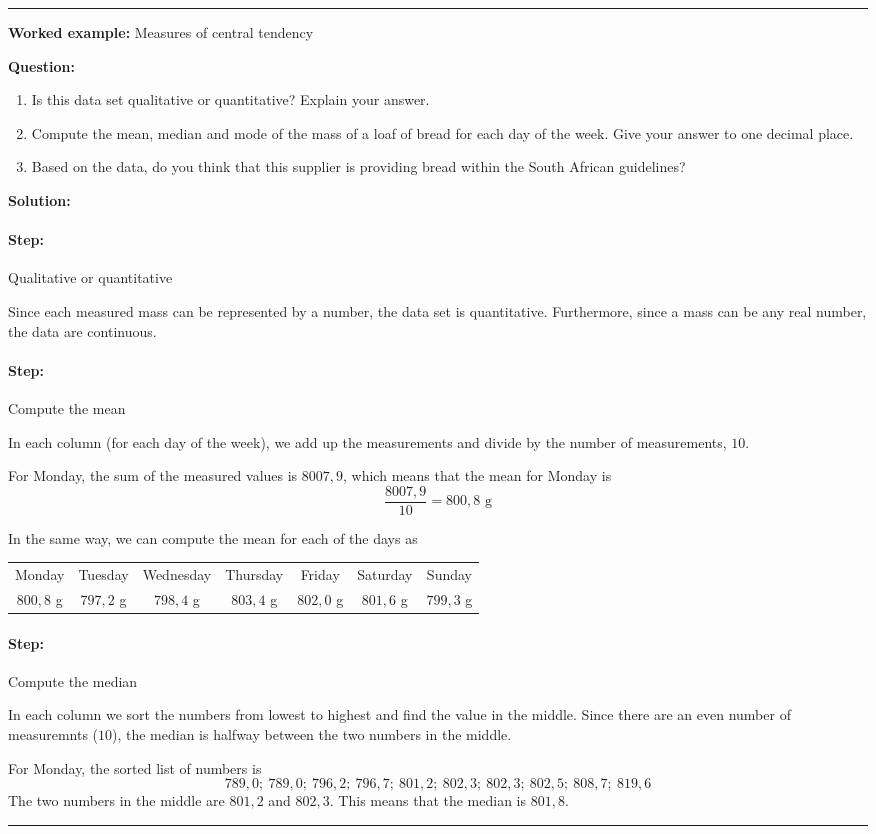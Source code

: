 \documentclass[a4paper,11pt]{report}
\newenvironment{wex}[3]%
{\rule{\linewidth}{0.5mm}
\textbf{Worked example:} #1

\textbf{Question:} #2

\textbf{Solution:} #3}%
{\rule{\linewidth}{0.5mm}}
\newcommand{\westep}[1]{\paragraph{Step:} #1}
\begin{document}
\begin{wex}{Measures of central tendency}
{    \begin{enumerate}
    \item Is this data set qualitative or quantitative? Explain your
      answer.
    \item Compute the mean, median and mode of the mass of a loaf of bread
      for each day of the week. Give your answer to one decimal place.
    \item Based on the data, do you think that this supplier is
      providing bread within the South African guidelines?
    \end{enumerate}
}{

  \westep{Qualitative or quantitative}

  Since each measured mass can be represented by a number, the data
  set is quantitative. Furthermore, since a mass can be any real
  number, the data are continuous.

  \westep{Compute the mean}

  In each column (for each day of the week), we add up the
  measurements and divide by the number of measurements, $10$.

  For Monday, the sum of the measured values is $8007,9$, which means
  that the mean for Monday is
  \begin{equation}
    \frac{8007,9}{10} = 800,8\textrm{ g}
  \end{equation}

  In the same way, we can compute the mean for each of the days as

  \begin{center}
    \begin{tabular}{ccccccc}
      \toprule
      Monday & Tuesday & Wednesday & Thursday & Friday & Saturday & Sunday \\
      $800,8$ g & $797,2$ g & $798,4$ g & $803,4$ g & $802,0$ g & $801,6$ g & $799,3$ g \\
      \bottomrule
    \end{tabular}
  \end{center}

  \westep{Compute the median}

  In each column we sort the numbers from lowest to highest and find
  the value in the middle. Since there are an even number of
  measuremnts ($10$), the median is halfway between the two numbers in
  the middle.

  For Monday, the sorted list of numbers is
  \begin{equation}
    789,0;\ 789,0;\ 796,2;\ 796,7;\ 801,2;\ 802,3;\ 802,3;\ 802,5;\ 808,7;\ 819,6
  \end{equation}
  The two numbers in the middle are $801,2$ and $802,3$. This means
  that the median is $801,8$.

}
\end{wex}
\end{document}
